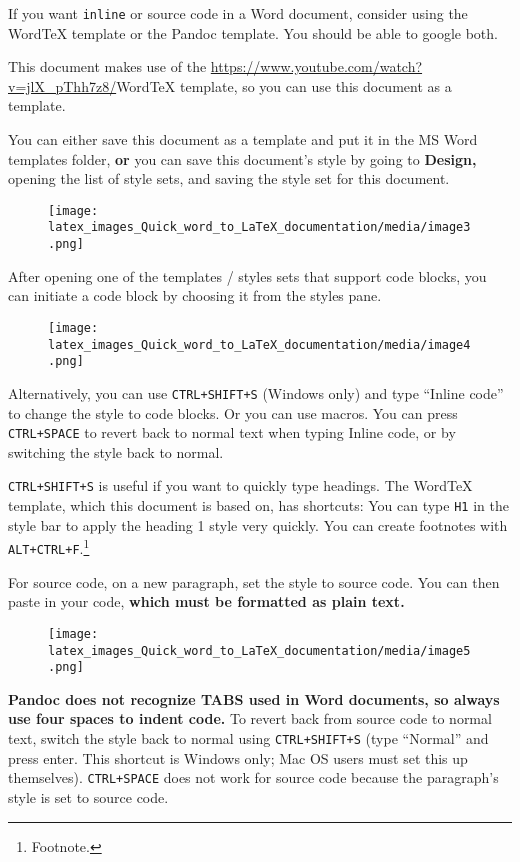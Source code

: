 \documentclass[12pt]{article}
\providecommand{\href}[1]{\url{#1}}
\theoremstyle{plain}
\theoremstyle{remark}
\theoremstyle{definition}
\begin{document}
If you want \texttt{inline} or source code in a Word document, consider
using the WordTeX template or the Pandoc template. You should be able to
google both.

This document makes use of the
\href{https://www.youtube.com/watch?v=jlX_pThh7z8/}{WordTeX} template,
so you can use this document as a template.

You can either save this document as a template and put it in the MS
Word templates folder, \textbf{or} you can save this document's style by
going to \textbf{Design,} opening the list of style sets, and saving the
style set for this document.


\begin{figure}[H]
\centering
\texttt{[image: latex\_images\_Quick\_word\_to\_LaTeX\_documentation/media/image3.png]}
\end{figure}

After opening one of the templates / styles sets that support code
blocks, you can initiate a code block by choosing it from the styles
pane.


\begin{figure}[H]
\centering
\texttt{[image: latex\_images\_Quick\_word\_to\_LaTeX\_documentation/media/image4.png]}
\end{figure}

Alternatively, you can use \texttt{CTRL+SHIFT+S} (Windows only) and type
``Inline code'' to change the style to code blocks. Or you can use
macros. You can press \texttt{CTRL+SPACE} to revert back to normal text
when typing Inline code, or by switching the style back to normal.

\texttt{CTRL+S}\texttt{HIF}\texttt{T+S} is useful if you want to quickly
type headings. The WordTeX template, which this document is based on,
has shortcuts: You can type \texttt{H1} in the style bar to apply the
heading 1 style very quickly. You can create footnotes with
\texttt{ALT+CTRL+F}.\footnote{Footnote.}

For source code, on a new paragraph, set the style to source code. You
can then paste in your code, \textbf{which must be formatted as plain
text.}


\begin{figure}[H]
\centering
\texttt{[image: latex\_images\_Quick\_word\_to\_LaTeX\_documentation/media/image5.png]}
\end{figure}

\textbf{Pandoc does not recognize TABS used in Word documents, so always
use four spaces to indent code.} To revert back from source code to
normal text, switch the style back to normal using \texttt{CTRL+SHIFT+S}
(type ``Normal'' and press enter. This shortcut is Windows only; Mac OS
users must set this up themselves). \texttt{CTRL+SPACE} does not work
for source code because the paragraph's style is set to source code.
\end{document}
